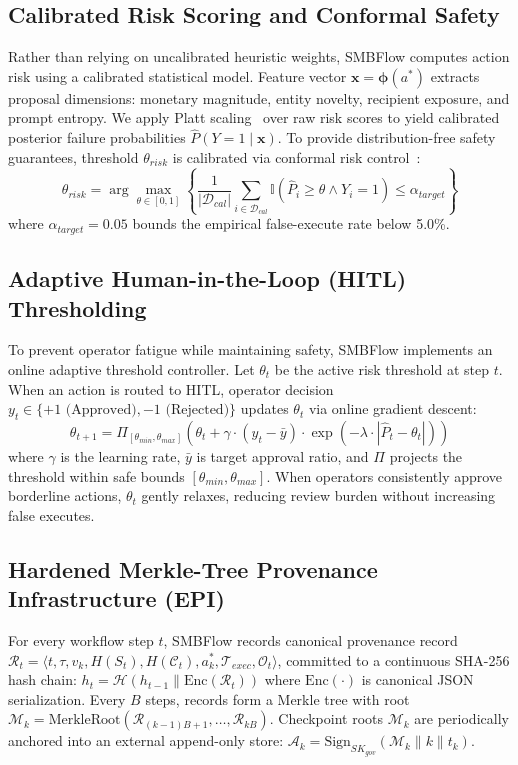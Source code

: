\documentclass[conference]{IEEEtran}
\begin{document}
\subsection{Calibrated Risk Scoring and Conformal Safety}
Rather than relying on uncalibrated heuristic weights, SMBFlow computes action risk using a calibrated statistical model. Feature vector $\mathbf{x} = \boldsymbol{\phi}(a^*)$ extracts proposal dimensions: monetary magnitude, entity novelty, recipient exposure, and prompt entropy. We apply Platt scaling~\cite{platt1999probabilistic, guo2017calibration} over raw risk scores to yield calibrated posterior failure probabilities $\hat{P}(Y=1 \mid \mathbf{x})$. To provide distribution-free safety guarantees, threshold $\theta_{risk}$ is calibrated via conformal risk control~\cite{angelopoulos2021conformal}:
\begin{equation}
\theta_{risk} = \arg\max_{\theta \in [0, 1]} \left\{ \frac{1}{|\mathcal{D}_{cal}|} \sum_{i \in \mathcal{D}_{cal}} \mathbb{I}(\hat{P}_i \ge \theta \wedge Y_i = 1) \le \alpha_{target} \right\}
\end{equation}
where $\alpha_{target} = 0.05$ bounds the empirical false-execute rate below 5.0\%.

\subsection{Adaptive Human-in-the-Loop (HITL) Thresholding}
To prevent operator fatigue while maintaining safety, SMBFlow implements an online adaptive threshold controller. Let $\theta_t$ be the active risk threshold at step $t$. When an action is routed to HITL, operator decision $y_t \in \{+1 \text{ (Approved)}, -1 \text{ (Rejected)}\}$ updates $\theta_{t}$ via online gradient descent:
\begin{equation}
\theta_{t+1} = \Pi_{[\theta_{min}, \theta_{max}]} \left( \theta_t + \gamma \cdot (y_t - \bar{y}) \cdot \exp(-\lambda \cdot |\hat{P}_t - \theta_t|) \right)
\end{equation}
where $\gamma$ is the learning rate, $\bar{y}$ is target approval ratio, and $\Pi$ projects the threshold within safe bounds $[\theta_{min}, \theta_{max}]$. When operators consistently approve borderline actions, $\theta_t$ gently relaxes, reducing review burden without increasing false executes.

\subsection{Hardened Merkle-Tree Provenance Infrastructure (EPI)}
For every workflow step $t$, SMBFlow records canonical provenance record $\mathcal{R}_t = \langle t, \tau, v_k, H(S_t), H(\mathcal{C}_t), a_k^*, \mathcal{T}_{exec}, \mathcal{O}_t \rangle$, committed to a continuous SHA-256 hash chain: $h_t = \mathcal{H}( h_{t-1} \parallel \text{Enc}(\mathcal{R}_t) )$ where $\text{Enc}(\cdot)$ is canonical JSON serialization. Every $B$ steps, records form a Merkle tree with root $\mathcal{M}_k = \text{MerkleRoot}(\mathcal{R}_{(k-1)B+1}, \dots, \mathcal{R}_{kB})$. Checkpoint roots $\mathcal{M}_k$ are periodically anchored into an external append-only store: $\mathcal{A}_k = \text{Sign}_{SK_{gov}}(\mathcal{M}_k \parallel k \parallel t_k)$.
\end{document}
